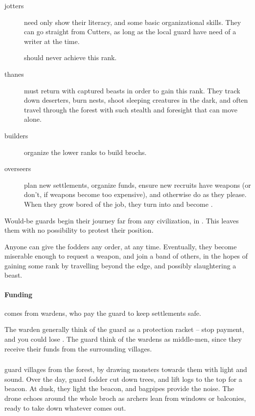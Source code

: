 \begin{multicols}{2}
\begin{description}
  \item[\Glspl{jotter}]
  \label{jotter}%
  need only show their literacy, and some basic organizational skills.
  They can go straight from Cutters, as long as the local \gls{guard} have need of a writer at the time.

   should never achieve this rank.

  \item[\Glspl{thane}]
  \label{thanes}
  must return with captured beasts in order to gain this rank.
  They track down deserters, burn nests, shoot sleeping creatures in the dark, and often travel through the forest with such stealth and foresight that can move alone.
  
  \item[\Glspl{builder}]
  organize the lower ranks to build \glspl{broch}.

  \item[\Glspl{overseer}]
  plan new settlements, organize funds, ensure new recruits have weapons (or don't, if weapons become too expensive), and otherwise do as they please.
  When they grow bored of the job, they turn  into  and become .

\end{description}

\noindent
Would-be \glspl{guard} begin their journey far from any civilization, in .
This leaves them with no possibility to protest their position.

Anyone can give the \glspl{fodder} any order, at any time.
Eventually, they become miserable enough to request a weapon, and join a band of others, in the hopes of gaining some rank by travelling beyond the \gls{edge}, and possibly slaughtering a beast.


\paragraph{Funding}
comes from \glspl{warden}, who pay the guard to keep settlements safe.

The \gls{warden} generally think of the \gls{guard} as a protection racket -- stop payment, and you could lose .
The \gls{guard} think of the \glspl{warden} as middle-men, since they receive their funds from the surrounding \glspl{village}.

\subsubsection{}
guard \glspl{village} from the forest, by drawing monsters towards them with light and sound.
Over the day, \gls{guard} fodder cut down trees, and lift logs to the top for a beacon.
At dusk, they light the beacon, and bagpipes provide the noise.
The drone echoes around the whole \gls{broch} as archers lean from windows or balconies, ready to take down whatever comes out.


\end{multicols}
